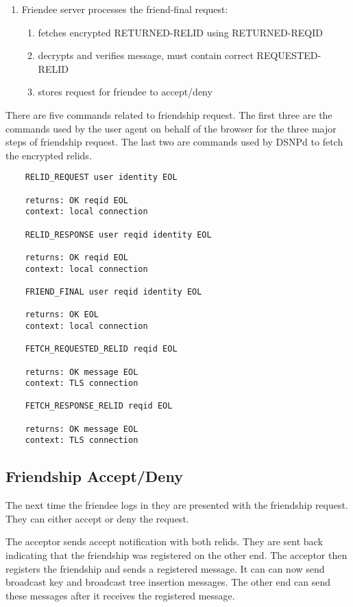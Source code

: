 \documentclass[letterpaper,11pt,oneside]{article}
\begin{document}
\begin{enumerate}
\item Friendee server processes the friend-final request:
    \begin{enumerate}
    \item fetches encrypted RETURNED-RELID using RETURNED-REQID
    \item decrypts and verifies message, must contain correct REQUESTED-RELID
    \item stores request for friendee to accept/deny
    \end{enumerate}
\end{enumerate}

There are five commands related to friendship request. The first three are the
commands used by the user agent on behalf of the browser for the three major
steps of friendship request. The last two are commands used by DSNPd to fetch
the encrypted relids.

\vspace{10pt}
\begin{verbatim}
    RELID_REQUEST user identity EOL

    returns: OK reqid EOL
    context: local connection

    RELID_RESPONSE user reqid identity EOL

    returns: OK reqid EOL
    context: local connection

    FRIEND_FINAL user reqid identity EOL

    returns: OK EOL
    context: local connection

    FETCH_REQUESTED_RELID reqid EOL

    returns: OK message EOL
    context: TLS connection

    FETCH_RESPONSE_RELID reqid EOL

    returns: OK message EOL
    context: TLS connection
\end{verbatim}

\subsection{Friendship Accept/Deny}

The next time the friendee logs in they are presented with the friendship
request. They can either accept or deny the request. 

The acceptor sends accept notification with both relids. They are sent back
indicating that the friendship was registered on the other end. The acceptor
then registers the friendship and sends a registered message. It can can now
send broadcast key and broadcast tree insertion messages. The other end can
send these messages after it receives the registered message.
\end{document}
